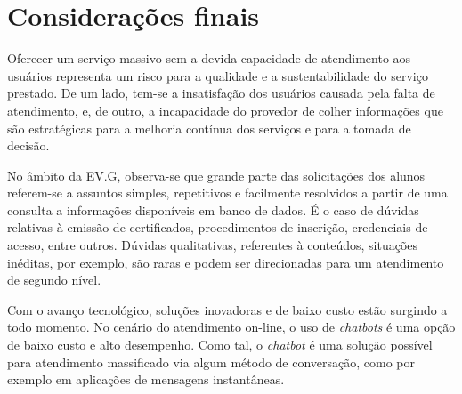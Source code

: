 %
%
%
%

\chapter{Considerações finais}

Oferecer um serviço massivo sem a devida capacidade de atendimento aos usuários representa um risco para a qualidade e a sustentabilidade do serviço prestado. De um lado, tem-se a insatisfação dos usuários causada pela falta de atendimento, e, de outro, a incapacidade do provedor de colher informações que são estratégicas para a melhoria contínua dos serviços e para a tomada de decisão.

No âmbito da EV.G, observa-se que grande parte das solicitações dos alunos referem-se a assuntos simples, repetitivos e facilmente resolvidos a partir de uma consulta a informações disponíveis em banco de dados. É o caso de dúvidas relativas à emissão de certificados, procedimentos de inscrição, credenciais de acesso, entre outros. Dúvidas qualitativas, referentes à conteúdos, situações inéditas, por exemplo, são raras e podem ser direcionadas para um atendimento de segundo nível.  

Com o avanço tecnológico, soluções inovadoras e de baixo custo estão surgindo a todo momento. No cenário do atendimento on-line, o uso de \textit{chatbots} é uma opção de baixo custo e alto desempenho. Como tal, o \textit{chatbot} é uma solução possível para atendimento massificado via algum método de conversação, como por exemplo em aplicações de mensagens instantâneas.

